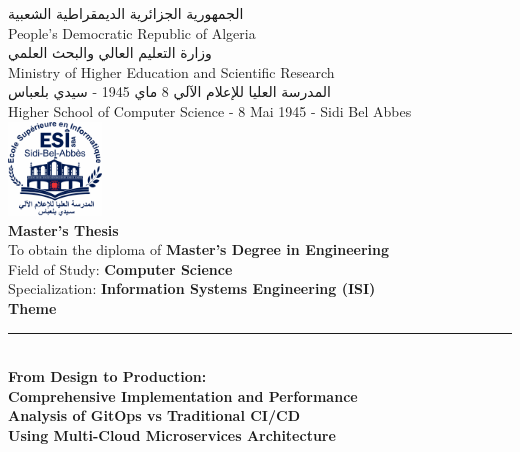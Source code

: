 \thispagestyle{empty}

\begin{center}

{\footnotesize \textarabic{الجمهورية الجزائرية الديمقراطية الشعبية}} \\[0.1cm]
{\footnotesize People's Democratic Republic of Algeria} \\[0.2cm]

{\footnotesize \textarabic{وزارة التعليم العالي والبحث العلمي}} \\[0.1cm]
{\footnotesize Ministry of Higher Education and Scientific Research} \\[0.2cm]

{\footnotesize \textarabic{المدرسة العليا للإعلام الآلي 8 ماي 1945 - سيدي بلعباس}} \\[0.1cm]
{\footnotesize Higher School of Computer Science - 8 Mai 1945 - Sidi Bel Abbes} \\[0.4cm]

\includegraphics[width=2.5cm]{figures/logos/esi-sba-logo.png} \\[0.3cm]

{\Large \textbf{Master's Thesis}} \\[0.5cm]

{\small To obtain the diploma of \textbf{Master's Degree in Engineering}} \\[0.15cm]
{\small Field of Study: \textbf{Computer Science}} \\[0.15cm]
{\small Specialization: \textbf{Information Systems Engineering (ISI)}} \\[0.6cm]

{\large \textbf{Theme}} \\[0.3cm]
\rule{14cm}{0.5pt} \\[0.5cm]

{\Large \textbf{From Design to Production:}} \\[0.3cm]
{\Large \textbf{Comprehensive Implementation and Performance}} \\[0.3cm]
{\Large \textbf{Analysis of GitOps vs Traditional CI/CD}} \\[0.3cm]
{\Large \textbf{Using Multi-Cloud Microservices Architecture}} \\[0.4cm]


\end{center}
